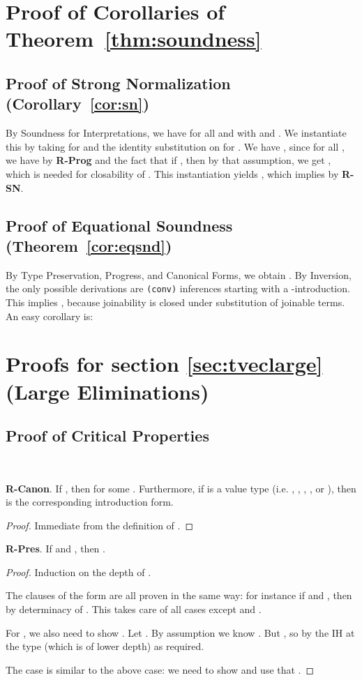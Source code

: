 \documentclass[copyright]{eptcs}
\begin{document}
\section{Proof of Corollaries of Theorem~\ref{thm:soundness}}

\subsection{Proof of Strong Normalization (Corollary~\ref{cor:sn})}

By Soundness for Interpretations,
we have  for all  and
 with  and
.  We instantiate this by taking
 for  and the identity substitution  on
 for .  We have
, since for all
, we have 
by \textbf{R-Prog} and the fact that if ,
then by that assumption, we get , which is needed for closability of .  This
instantiation yields , which implies
 by \textbf{R-SN}.


\subsection{Proof of Equational Soundness (Theorem~\ref{cor:eqsnd})}

By Type Preservation, Progress, and
Canonical Forms, we obtain .  By Inversion, the only
possible derivations are \texttt{(conv)} inferences starting with a
-introduction.  This implies , because
joinability is closed under substitution of joinable terms.  An easy
corollary is:

\section{Proofs for section \ref{sec:tveclarge} (Large Eliminations)}


\subsection{Proof of Critical Properties}

\

\noindent \textbf{R-Canon}. If , then  for some . Furthermore,
if  is a value type (i.e. , , , , or ), then  is the corresponding introduction form.

\begin{proof} Immediate from the definition of .
\end{proof}

\noindent \textbf{R-Pres}. If  and , then .

\begin{proof}Induction on the depth of .

The clauses of the form  are all proven in the same way: for instance if  and , then  by determinacy of . This takes care of all cases except  and .

For , we also need to show . Let . By assumption we know . But , so by the IH at the type  (which is of lower depth)  as required.

The case  is similar to the above case: we need to show  and use that .
\end{proof}
\end{document}

